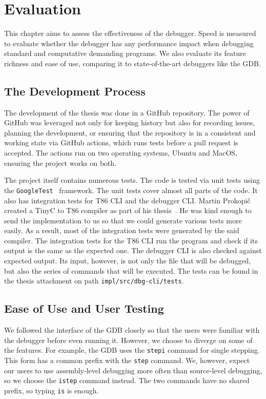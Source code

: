 \chapter{Evaluation}
This chapter aims to assess the effectiveness of the debugger. Speed is
measured to evaluate whether the debugger has any performance impact when
debugging standard and computative demanding programs. We also evaluate its
feature richness and ease of use, comparing it to state-of-the-art debuggers
like the GDB.

\section{The Development Process}
The development of the thesis was done in a GitHub repository. The power of
GitHub was leveraged not only for keeping history but also for recording
issues, planning the development, or ensuring that the repository is in a
consistent and working state via GitHub actions, which runs tests before a pull
request is accepted. The actions run on two operating systems, Ubuntu and
MacOS, ensuring the project works on both.

The project itself contains numerous tests. The code is tested via unit tests
using the \texttt{GoogleTest}~\cite{gtest} framework. The unit tests cover
almost all parts of the code. It also has integration tests for T86 CLI and the
debugger CLI. Martin Prokopič created a TinyC to T86 compiler as part of his
thesis~\cite{martintinyc}. He was kind enough to send the implementation to us
so that we could generate various tests more easily. As a result, most of the
integration tests were generated by the said compiler. The integration tests
for the T86 CLI run the program and check if its output is the same as the
expected one. The debugger CLI is also checked against expected output. Its
input, however, is not only the file that will be debugged, but also the series
of commands that will be executed. The tests can be found in the thesis
attachment on path \texttt{impl/src/dbg-cli/tests}.

\section{Ease of Use and User Testing}
We followed the interface of the GDB closely so that the users were familiar
with the debugger before even running it. However, we choose to diverge on some
of the features. For example, the GDB uses the \texttt{stepi} command for
single stepping. This form has a common prefix with the \texttt{step} command.
We, however, expect our users to use assembly-level debugging more often than
source-level debugging, so we choose the \texttt{istep} command instead. The
two commands have no shared prefix, so typing \texttt{is} is enough.

